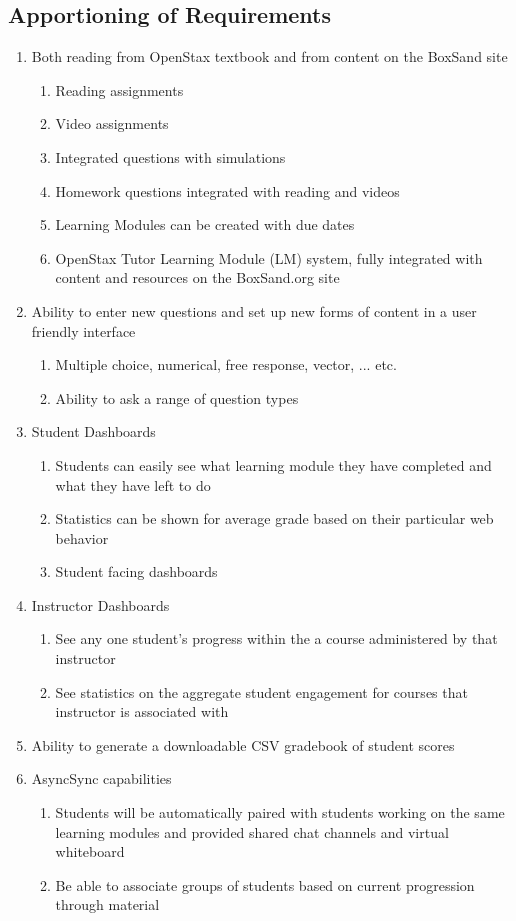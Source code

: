 \documentclass[onecolumn, draftclsnofoot,10pt, compsoc]{IEEEtran}
\begin{document}
\subsection{Apportioning of Requirements}
\begin{enumerate}
    \item Both reading from OpenStax textbook and from content on the BoxSand site
    \begin{enumerate}
        \item Reading assignments
        \item Video assignments
        \item Integrated questions with simulations
        \item Homework questions integrated with reading and videos
        \item Learning Modules can be created with due dates
        \item OpenStax Tutor Learning Module (LM) system, fully integrated with content and resources on the BoxSand.org site
    \end{enumerate}
    \item Ability to enter new questions and set up new forms of content in a user friendly interface
    \begin{enumerate}
        \item Multiple choice, numerical, free response, vector, ... etc.
        \item Ability to ask a range of question types
    \end{enumerate}
    \item Student Dashboards
    \begin{enumerate}
        \item Students can easily see what learning module they have completed and what they have left to do
        \item Statistics can be shown for average grade based on their particular web behavior
        \item Student facing dashboards
    \end{enumerate}
    \item Instructor Dashboards
    \begin{enumerate}
        \item See any one student's progress within the a course administered by that instructor
        \item See statistics on the aggregate student engagement for courses that instructor is associated with
    \end{enumerate}
    \item Ability to generate a downloadable CSV gradebook of student scores
    \item AsyncSync capabilities
    \begin{enumerate}
        \item Students will be automatically paired with students working on the same learning modules and provided shared chat channels and virtual whiteboard
        \item Be able to associate groups of students based on current progression through material
    \end{enumerate}
\end{enumerate}
\end{document}
